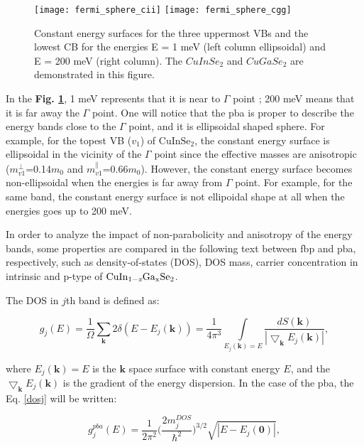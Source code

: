 \documentclass[a4paper, 12pt, titlepage,oneside,drop]{kthesis}
\begin{document}
\begin{figure}[H]
    \begin{center}
            \texttt{[image: fermi\_sphere\_cii]}
            \texttt{[image: fermi\_sphere\_cgg]}
     \end{center}
    \caption{Constant energy surfaces for the three uppermost VBs and the lowest CB for the energies E = 1 meV (left column ellipsoidal) and E = 200 meV (right column).  
The $CuInSe_2$ and $CuGaSe_2$ are demonstrated in this figure.}
    \label{cse}
\end{figure}

In the \textbf{Fig. \ref{cse}}, 1 meV represents that it is near to $\Gamma$ point ; 200 meV means that it is far away the $\Gamma$ point.
One will notice that the pba is proper to describe the energy bands close to the $\Gamma$ point, and it is ellipsoidal shaped sphere. For example,
for the topest VB ($v_1$) of $\mathrm{CuInSe_2}$, the constant energy surface is ellipsoidal in the vicinity of the $\Gamma$ point since the effective
masses are anisotropic ($m_{v1}^{\perp}$=0.14$m_0$ and $m_{v1}^{\parallel}$=0.66$m_0$). However, the constant energy surface becomes non-ellipsoidal when the energies 
is far away from $\Gamma$ point. For example, for the same band, the constant energy surface is not ellipoidal shape at all when the energies goes up to 200 meV.

In order to analyze the impact of non-parabolicity and anisotropy of the energy bands, some properties are compared in the following text between fbp and pba, respectively, such as density-of-states (DOS),
DOS mass, carrier concentration in intrinsic and p-type of $\mathrm { CuIn_{1-\textit{x}}Ga_{x}Se_2}$.

The DOS in $j$th band is defined as:

\begin{equation}\label{dosj}
 g_j(E)=\frac{1}{\Omega} \sum \limits_{\textbf{k}} 2 \delta (E-E_j(\textbf{k})) = \frac{1}{4\pi^3} \int \limits_{E_j(\textbf{k}) = E} \frac{dS(\textbf{k})}{|\bigtriangledown_\textbf{k} E_j(\textbf{k})|},
\end{equation}
 
where $E_j(\textbf{k}) = E$ is the $\textbf{k}$ space surface with constant energy $E$, and the $\bigtriangledown_\textbf{k} E_j(\textbf{k})$ is the gradient of the energy dispersion.
In the case of the pba, the Eq. \ref{dosj} will be written:

\begin{equation}\label{dosjp}
 g_j^{pba}(E) = \frac{1}{2\pi^2} \big(\frac{2m_j^{DOS}}{\hbar^2}\big)^{3/2} \sqrt{|E-E_j(\textbf{0})|},
\end{equation}
 
\end{document}
